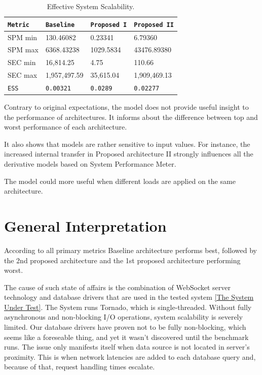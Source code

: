 \documentclass{uvamscse}
\begin{document}
\begin{table}[H]
\begin{center}
\begin{tabular}{llll}
  \texttt{Metric}               & \texttt{Baseline}   & \texttt{Proposed I}  & \texttt{Proposed II}  \\
  \hline
  SPM min                       & 130.46082           & 0.23341              & 6.79360                 \\
  SPM max                       & 6368.43238          & 1029.5834            & 43476.89380                 \\
  \hline
  SEC min                       & 16,814.25           & 4.75                 & 110.66         \\
  SEC max                       & 1,957,497.59        & 35,615.04            & 1,909,469.13         \\
  \hline
  \texttt{ESS}                   & \texttt{0.00321}     & \texttt{0.0289}      & \texttt{0.02277}
\end{tabular}
\end{center}
\caption{Effective System Scalability.}
\label{table:ess}
\end{table}

Contrary to original expectations, the model does not provide useful insight to the performance of architectures. It informs about the difference between top and worst performance of each architecture.

It also shows that models are rather sensitive to input values. For instance, the increased internal transfer in Proposed architecture II strongly influences all the derivative models based on System Performance Meter.

The model could more useful when different loads are applied on the same architecture.

\section{General Interpretation}

According to all primary metrics Baseline architecture performs best, followed by the 2nd proposed architecture and the 1st proposed architecture performing worst.

The cause of such state of affairs is the combination of WebSocket server technology and database drivers that are used in the tested system \ref{The System Under Test}. The System runs Tornado, which is single-threaded. Without fully asynchronous and non-blocking I/O operations, system scalability is severely limited. Our database drivers have proven not to be fully non-blocking, which seems like a foreseable thing, and yet it wasn't discovered until the benchmark runs. The issue only manifests itself when data source is not located in server's proximity. This is when network latencies are added to each database query and, because of that, request handling times escalate.
\end{document}
